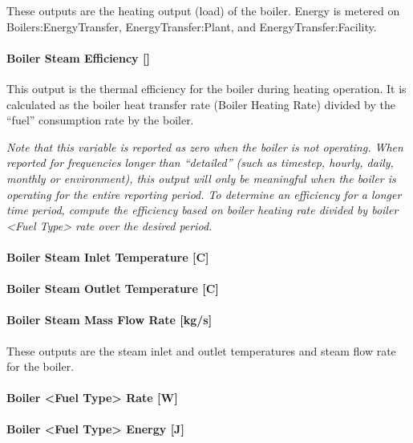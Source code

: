 These outputs are the heating output (load) of the boiler. Energy is metered on Boilers:EnergyTransfer, EnergyTransfer:Plant, and EnergyTransfer:Facility.

\paragraph{Boiler Steam Efficiency {[]}}\label{boiler-steam-efficiency}

This output is the thermal efficiency for the boiler during heating operation. It is calculated as the boiler heat transfer rate (Boiler Heating Rate) divided by the ``fuel'' consumption rate by the boiler.

\emph{Note that this variable is reported as zero when the boiler is not operating. When reported for frequencies longer than ``detailed'' (such as timestep, hourly, daily, monthly or environment), this output will only be meaningful when the boiler is operating for the entire reporting period. To determine an efficiency for a longer time period, compute the efficiency based on boiler heating rate divided by boiler \textless{}Fuel Type\textgreater{} rate over the desired period.}

\paragraph{Boiler Steam Inlet Temperature {[}C{]}}\label{boiler-steam-inlet-temperature-c}

\paragraph{Boiler Steam Outlet Temperature {[}C{]}}\label{boiler-steam-outlet-temperature-c}

\paragraph{Boiler Steam Mass Flow Rate {[}kg/s{]}}\label{boiler-steam-mass-flow-rate-kgs}

These outputs are the steam inlet and outlet temperatures and steam flow rate for the boiler.

\paragraph{Boiler \textless{}Fuel Type\textgreater{} Rate {[}W{]}}\label{boiler-fuel-type-rate-w-1}

\paragraph{Boiler \textless{}Fuel Type\textgreater{} Energy {[}J{]}}\label{boiler-fuel-type-energy-j-1}

